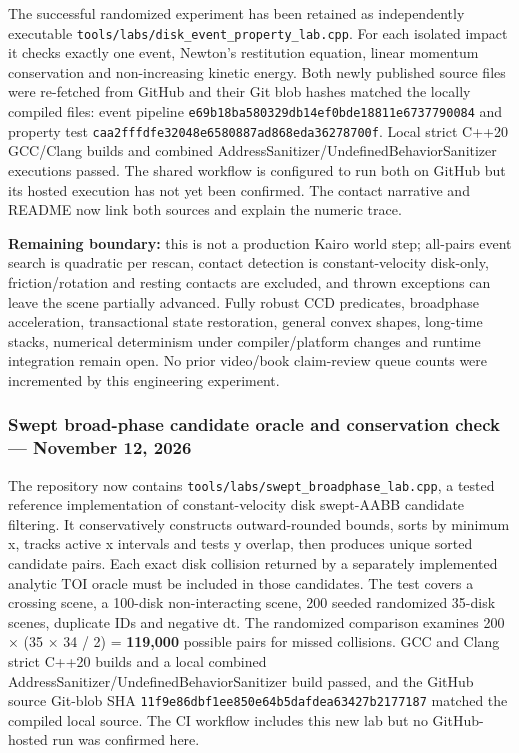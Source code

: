 The successful randomized experiment has been retained as independently executable \texttt{tools/labs/disk\_event\_property\_lab.cpp}. For each isolated impact it checks exactly one event, Newton's restitution equation, linear momentum conservation and non-increasing kinetic energy. Both newly published source files were re-fetched from GitHub and their Git blob hashes matched the locally compiled files: event pipeline \texttt{e69b18ba580329db14ef0bde18811e6737790084} and property test \texttt{caa2fffdfe32048e6580887ad868eda36278700f}. Local strict C++20 GCC/Clang builds and combined AddressSanitizer/UndefinedBehaviorSanitizer executions passed. The shared workflow is configured to run both on GitHub but its hosted execution has not yet been confirmed. The contact narrative and README now link both sources and explain the numeric trace.

\textbf{Remaining boundary:} this is not a production Kairo world step; all-pairs event search is quadratic per rescan, contact detection is constant-velocity disk-only, friction/rotation and resting contacts are excluded, and thrown exceptions can leave the scene partially advanced. Fully robust CCD predicates, broadphase acceleration, transactional state restoration, general convex shapes, long-time stacks, numerical determinism under compiler/platform changes and runtime integration remain open. No prior video/book claim-review queue counts were incremented by this engineering experiment.

\subsubsection{Swept broad-phase candidate oracle and conservation check --- November 12, 2026}\label{appendix-3b67654799a2-swept-broad-phase-candidate-oracle-and-conservation-check-november-12-2026}

The repository now contains \texttt{tools/labs/swept\_broadphase\_lab.cpp}, a tested reference implementation of constant-velocity disk swept-AABB candidate filtering. It conservatively constructs outward-rounded bounds, sorts by minimum x, tracks active x intervals and tests y overlap, then produces unique sorted candidate pairs. Each exact disk collision returned by a separately implemented analytic TOI oracle must be included in those candidates. The test covers a crossing scene, a 100-disk non-interacting scene, 200 seeded randomized 35-disk scenes, duplicate IDs and negative dt. The randomized comparison examines 200 × (35 × 34 / 2) = \textbf{119,000} possible pairs for missed collisions. GCC and Clang strict C++20 builds and a local combined AddressSanitizer/UndefinedBehaviorSanitizer build passed, and the GitHub source Git-blob SHA \texttt{11f9e86dbf1ee850e64b5dafdea63427b2177187} matched the compiled local source. The CI workflow includes this new lab but no GitHub-hosted run was confirmed here.


